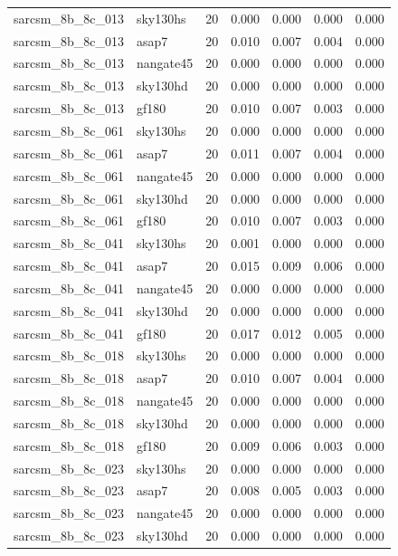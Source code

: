 \begin{tabular}{llrrrrr}
sarcsm\_8b\_8c\_013 & sky130hs & 20 & 0.000 & 0.000 & 0.000 & 0.000 \\
sarcsm\_8b\_8c\_013 & asap7 & 20 & 0.010 & 0.007 & 0.004 & 0.000 \\
sarcsm\_8b\_8c\_013 & nangate45 & 20 & 0.000 & 0.000 & 0.000 & 0.000 \\
sarcsm\_8b\_8c\_013 & sky130hd & 20 & 0.000 & 0.000 & 0.000 & 0.000 \\
sarcsm\_8b\_8c\_013 & gf180 & 20 & 0.010 & 0.007 & 0.003 & 0.000 \\
sarcsm\_8b\_8c\_061 & sky130hs & 20 & 0.000 & 0.000 & 0.000 & 0.000 \\
sarcsm\_8b\_8c\_061 & asap7 & 20 & 0.011 & 0.007 & 0.004 & 0.000 \\
sarcsm\_8b\_8c\_061 & nangate45 & 20 & 0.000 & 0.000 & 0.000 & 0.000 \\
sarcsm\_8b\_8c\_061 & sky130hd & 20 & 0.000 & 0.000 & 0.000 & 0.000 \\
sarcsm\_8b\_8c\_061 & gf180 & 20 & 0.010 & 0.007 & 0.003 & 0.000 \\
sarcsm\_8b\_8c\_041 & sky130hs & 20 & 0.001 & 0.000 & 0.000 & 0.000 \\
sarcsm\_8b\_8c\_041 & asap7 & 20 & 0.015 & 0.009 & 0.006 & 0.000 \\
sarcsm\_8b\_8c\_041 & nangate45 & 20 & 0.000 & 0.000 & 0.000 & 0.000 \\
sarcsm\_8b\_8c\_041 & sky130hd & 20 & 0.000 & 0.000 & 0.000 & 0.000 \\
sarcsm\_8b\_8c\_041 & gf180 & 20 & 0.017 & 0.012 & 0.005 & 0.000 \\
sarcsm\_8b\_8c\_018 & sky130hs & 20 & 0.000 & 0.000 & 0.000 & 0.000 \\
sarcsm\_8b\_8c\_018 & asap7 & 20 & 0.010 & 0.007 & 0.004 & 0.000 \\
sarcsm\_8b\_8c\_018 & nangate45 & 20 & 0.000 & 0.000 & 0.000 & 0.000 \\
sarcsm\_8b\_8c\_018 & sky130hd & 20 & 0.000 & 0.000 & 0.000 & 0.000 \\
sarcsm\_8b\_8c\_018 & gf180 & 20 & 0.009 & 0.006 & 0.003 & 0.000 \\
sarcsm\_8b\_8c\_023 & sky130hs & 20 & 0.000 & 0.000 & 0.000 & 0.000 \\
sarcsm\_8b\_8c\_023 & asap7 & 20 & 0.008 & 0.005 & 0.003 & 0.000 \\
sarcsm\_8b\_8c\_023 & nangate45 & 20 & 0.000 & 0.000 & 0.000 & 0.000 \\
sarcsm\_8b\_8c\_023 & sky130hd & 20 & 0.000 & 0.000 & 0.000 & 0.000 \\

\end{tabular}
